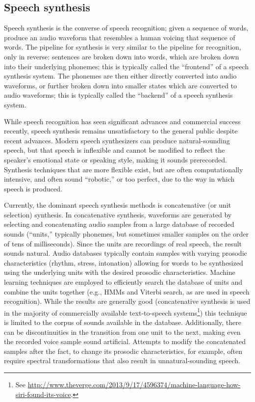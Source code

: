 \documentclass{article}
\begin{document}
\subsection{Speech synthesis}

Speech synthesis is the converse
of speech recognition;
given a sequence of words,
produce an audio waveform
that resembles a human
voicing that sequence of words.
The pipeline for synthesis is very similar
to the pipeline for recognition,
only in reverse:
sentences are broken down into words,
which are broken down into
their underlying phonemes;
this is typically called the
``frontend'' of a speech synthesis system.
The phonemes are then either
directly converted into audio waveforms,
or further broken down into
smaller states which are converted to audio waveforms;
this is typically called the ``backend''
of a speech synthesis system.

While speech recognition
has seen significant advances
and commercial success recently,
speech synthesis remains
unsatisfactory to the general public
despite recent advances.
Modern speech synthesizers can
produce natural-sounding speech,
but that speech is inflexible
and cannot be modified
to reflect the speaker's
emotional state or speaking style,
making it sounds prerecorded.
Synthesis techniques
that are more flexible exist,
but are often computationally intensive,
and often sound ``robotic,''
or too perfect,
due to the way in which
speech is produced.

Currently, the dominant speech synthesis
methods is concatenative (or unit selection) synthesis.
In concatenative synthesis, waveforms are generated
by selecting and concatenating audio samples
from a large database of recorded sounds
(``units,'' typically phonemes, but sometimes
smaller samples on the order of tens of milliseconds).
Since the units are recordings of real speech,
the result sounds natural.
Audio databases typically contain samples with
varying prosodic characteristics
(rhythm, stress, intonation)
allowing for words to be synthesized
using the underlying units
with the desired prosodic characteristics.
Machine learning techniques
are employed to efficiently search
the database of units and combine
the units together
(e.g., HMMs and Viterbi search,
as are used in speech recognition).
While the results are generally good
(concatenative synthesis is used in
the majority of commercially available
text-to-speech systems\footnote{See
  \url{http://www.theverge.com/2013/9/17/4596374/machine-language-how-siri-found-its-voice}.})
this technique is limited to the corpus
of sounds available in the database.
Additionally, there can be discontinuities
in the transition from one unit
to the next, making even the recorded
voice sample sound artificial.
Attempts to modify the concatenated
samples after the fact,
to change its prosodic characteristics,
for example, often require
spectral transformations that also
result in unnatural-sounding speech.
\end{document}
